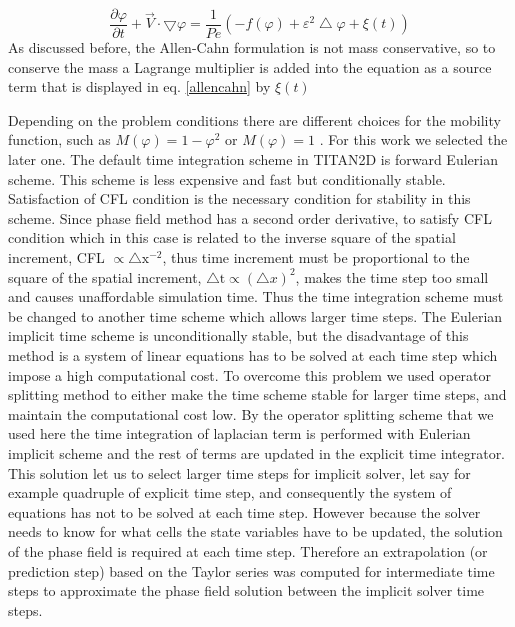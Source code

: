 \documentclass[letterpaper,10pt]{article}
\begin{document}
\begin{equation} 
\label{allencahn}
\frac{\partial \varphi }{\partial t} + \overrightarrow{V} \cdot \bigtriangledown \varphi = 
\frac{1}{Pe}(-f(\varphi)+\varepsilon^2\bigtriangleup\varphi+\xi(t))
\end{equation}
As discussed before, the Allen-Cahn formulation is not mass conservative, so to conserve the mass a Lagrange multiplier is added into 
the equation as a source term that is displayed in eq. \eqref{allencahn} by $\xi(t)$

% 

Depending on the problem conditions there are different choices for the mobility function, such 
as $M(\varphi)=1-\varphi^2$ or $M(\varphi)=1$ \cite{}. For this work we selected the later one.\newline
The default time integration scheme in TITAN2D is forward Eulerian scheme. This scheme is less expensive and fast but conditionally 
stable. Satisfaction of CFL condition is the necessary condition for stability in this scheme. Since phase field 
method has a second order derivative, to satisfy CFL condition which in this case is related to the inverse square of the spatial increment, CFL $\propto \bigtriangleup \text{x}^{-2}$, thus time increment must be proportional to the square 
of the spatial increment, $\bigtriangleup \text{t} \propto ( \bigtriangleup x)^2 $, makes the time step too small and causes unaffordable simulation time.
Thus the time integration scheme must be changed to another time scheme which allows larger time steps.
The Eulerian implicit time scheme is unconditionally stable, but the disadvantage of this method is a system of linear equations has to be solved at each time step which impose a high computational cost.
To overcome this problem we used operator splitting method to either make the time scheme stable for larger time steps, and maintain the computational cost low.  
By the operator splitting scheme that we used here the time integration of laplacian term is performed with Eulerian implicit scheme and the rest of terms are updated in the explicit time integrator. This solution let us to select larger time steps for implicit solver, let say for example quadruple of explicit time step, and consequently the system of equations has not to be solved at each time step. However because the solver needs to know for what cells the state variables have to be updated, the solution of the phase field is required at each time step. Therefore an extrapolation (or prediction step) based on the Taylor series was computed for intermediate time steps to approximate the phase field solution between the implicit solver time steps.
\end{document}
